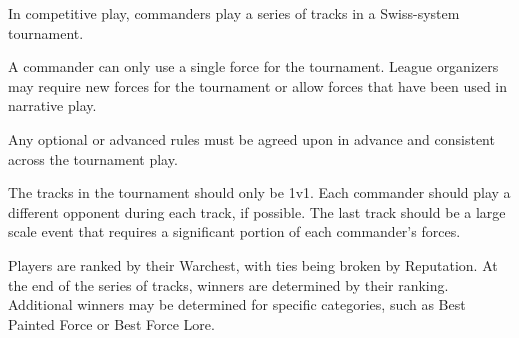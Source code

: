 In competitive play, commanders play a series of tracks in a Swiss-system tournament.

A commander can only use a single force for the tournament.
League organizers may require new forces for the tournament or allow forces that have been used in narrative play.

Any optional or advanced rules must be agreed upon in advance and consistent across the tournament play.

The tracks in the tournament should only be 1v1.
Each commander should play a different opponent during each track, if possible.
The last track should be a large scale event that requires a significant portion of each commander's forces.

Players are ranked by their Warchest, with ties being broken by Reputation.
At the end of the series of tracks, winners are determined by their ranking.
Additional winners may be determined for specific categories, such as Best Painted Force or Best Force Lore.
